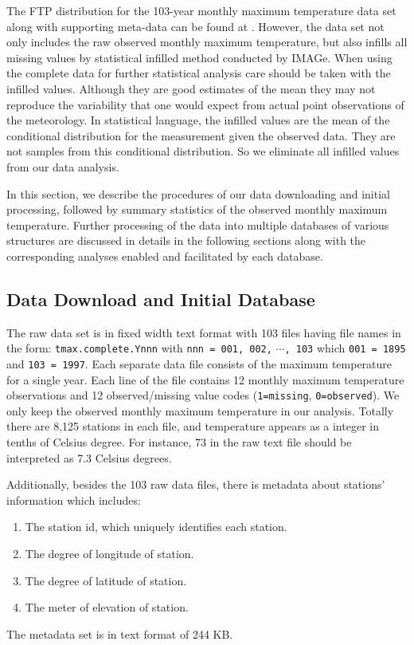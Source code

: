 The FTP distribution for the 103-year monthly maximum temperature data set along
with supporting meta-data can be found at \cite{data}. 
However, the data set not only includes the raw observed monthly
maximum temperature, but also infills all missing values by statistical infilled
method conducted by IMAGe. 
When using the complete data for further statistical analysis care should be taken
with the infilled values. Although they are good estimates of the mean they may 
not reproduce the variability that one would expect from actual point 
observations of the meteorology. In statistical language, the infilled values are
the mean of the conditional distribution for the measurement given the observed 
data. They are not samples from this conditional distribution. 
So we eliminate all infilled values from our data analysis.

In this section, we describe the procedures of our data downloading and initial 
processing, followed by summary statistics of the observed monthly maximum 
temperature. Further processing of the data into multiple databases of various 
structures are discussed in details in the following sections along with the 
corresponding analyses enabled and facilitated by each database.

\subsection{Data Download and Initial Database}
\label{sec:Download}

The raw data set is in fixed width text format with 103 files having file names in
the form: 
\texttt{tmax.complete.Ynnn} with \texttt{nnn = 001, 002,} $\cdots$\texttt{, 103} 
which \texttt{001 = 1895} and \texttt{103 = 1997}. Each separate data file consists
of the maximum temperature for a single year. Each line of the file contains 12
monthly maximum temperature observations and 12 observed/missing value codes 
(\texttt{1=missing}, \texttt{0=observed}). We only keep the observed monthly
maximum temperature in our analysis. Totally there are 8,125 stations in each file,
and temperature appears as a integer in tenths of Celsius degree. For instance, 73
in the raw text file should be interpreted as 7.3 Celsius degrees. 

Additionally, besides the 103 raw data files, there is metadata about stations' 
information which includes:
\begin{enumerate}
  \item The station id, which uniquely identifies each station.
  \item The degree of longitude of station.
  \item The degree of latitude of station.
  \item The meter of elevation of station.
\end{enumerate}
The metadata set is in text format of 244 KB.

